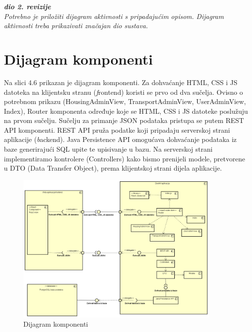 			\textbf{\textit{dio 2. revizije}}\\
			
			 \textit{Potrebno je priložiti dijagram aktivnosti s pripadajućim opisom. Dijagram aktivnosti treba prikazivati značajan dio sustava.}
			
			\eject
		\section{Dijagram komponenti}
		
			Na slici 4.6 prikazan je dijagram komponenti. Za dohvaćanje HTML, CSS i JS datoteka na klijentsku stranu (\textit frontend) koristi se prvo od dva sučelja. Ovisno o potrebnom prikazu (HousingAdminView, TransportAdminView, UserAdminView, Index), Router komponenta određuje koje se HTML, CSS i JS datoteke poslužuju na prvom sučelju. Sučelju za primanje JSON podataka pristupa se putem REST API komponenti. REST API pruža podatke koji pripadaju serverskoj strani aplikacije (\textit backend). Java Persistence API omogućava dohvaćanje podataka iz baze generirajući SQL upite te upisivanje u bazu. Na serverskoj strani implementiramo kontrolere (Controllers) kako bismo prenijeli modele, pretvorene u DTO (Data Transfer Object), prema klijentskoj strani dijela aplikacije.
			 \begin{figure}[htbp]
			 	\centering
			 	\includegraphics[width=0.9\textwidth]{dijagrami/DijagramKomponenti.png}
			 	\caption{Dijagram komponenti}
			 	\label{fig:DijagramKomponenti}
			 \end{figure}